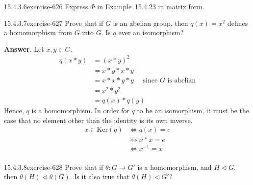 \documentclass[twoside,10pt,]{book}
\numberwithin{equation}{section}
\begin{document}
\begin{divisionsolution}{15.4.3.6}{}{exercise-626}%
\hypertarget{p-5611}{}%
Express \(\Phi\) in Example~15.4.23 in matrix form.%
\end{divisionsolution}%
\begin{divisionsolution}{15.4.3.7}{}{exercise-627}%
\hypertarget{p-5612}{}%
Prove that if \(G\) is an abelian group, then \(q(x) = x^2\) defines a homomorphism from \(G\) into \(G\).  Is \(q\) ever an isomorphism?%
\par\smallskip%
\noindent\textbf{Answer}.\quad%
\hypertarget{p-5613}{}%
Let \(x, y \in G\).%
\begin{equation*}
\begin{split}
q(x * y)  &= (x * y)^2\\ 
& = x*y*x*y \\
& = x*x*y*y \quad\textrm{ since } G \textrm{ is  abelian}\\
& =x^2*y^2 \\
&= q(x)*q(y)
\end{split}
\end{equation*}
Hence, \(q\) is a homomorphism. In order for \(q\) to be an isomorphism, it must be the case that no element other than the identity is its own inverse.%
\begin{equation*}
\begin{split}
x \in \textrm{Ker}(q) & \Leftrightarrow  q (x) = e \\
& \Leftrightarrow  x * x =e \\
& \Leftrightarrow   x^{-1}= x\\
\end{split}
\end{equation*}
%
\end{divisionsolution}%
\begin{divisionsolution}{15.4.3.8}{}{exercise-628}%
\hypertarget{p-5614}{}%
Prove that if \(\theta : G\rightarrow G'\) is a homomorphism, and \(H\triangleleft G\), then \(\theta(H) \triangleleft  \theta(G)\). Is it also true that \(\theta(H) \triangleleft  G'\)?%
\end{divisionsolution}%
\end{document}
